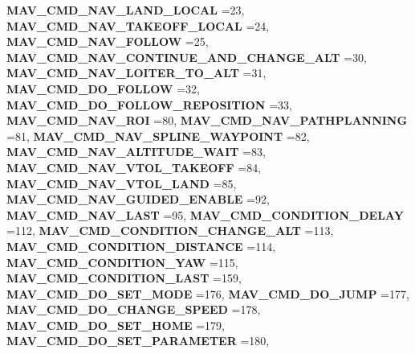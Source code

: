 \begin{DoxyCompactItemize}
\textbf{ M\+A\+V\+\_\+\+C\+M\+D\+\_\+\+N\+A\+V\+\_\+\+L\+A\+N\+D\+\_\+\+L\+O\+C\+AL} =23, 
\newline
\textbf{ M\+A\+V\+\_\+\+C\+M\+D\+\_\+\+N\+A\+V\+\_\+\+T\+A\+K\+E\+O\+F\+F\+\_\+\+L\+O\+C\+AL} =24, 
\textbf{ M\+A\+V\+\_\+\+C\+M\+D\+\_\+\+N\+A\+V\+\_\+\+F\+O\+L\+L\+OW} =25, 
\textbf{ M\+A\+V\+\_\+\+C\+M\+D\+\_\+\+N\+A\+V\+\_\+\+C\+O\+N\+T\+I\+N\+U\+E\+\_\+\+A\+N\+D\+\_\+\+C\+H\+A\+N\+G\+E\+\_\+\+A\+LT} =30, 
\textbf{ M\+A\+V\+\_\+\+C\+M\+D\+\_\+\+N\+A\+V\+\_\+\+L\+O\+I\+T\+E\+R\+\_\+\+T\+O\+\_\+\+A\+LT} =31, 
\newline
\textbf{ M\+A\+V\+\_\+\+C\+M\+D\+\_\+\+D\+O\+\_\+\+F\+O\+L\+L\+OW} =32, 
\textbf{ M\+A\+V\+\_\+\+C\+M\+D\+\_\+\+D\+O\+\_\+\+F\+O\+L\+L\+O\+W\+\_\+\+R\+E\+P\+O\+S\+I\+T\+I\+ON} =33, 
\textbf{ M\+A\+V\+\_\+\+C\+M\+D\+\_\+\+N\+A\+V\+\_\+\+R\+OI} =80, 
\textbf{ M\+A\+V\+\_\+\+C\+M\+D\+\_\+\+N\+A\+V\+\_\+\+P\+A\+T\+H\+P\+L\+A\+N\+N\+I\+NG} =81, 
\newline
\textbf{ M\+A\+V\+\_\+\+C\+M\+D\+\_\+\+N\+A\+V\+\_\+\+S\+P\+L\+I\+N\+E\+\_\+\+W\+A\+Y\+P\+O\+I\+NT} =82, 
\textbf{ M\+A\+V\+\_\+\+C\+M\+D\+\_\+\+N\+A\+V\+\_\+\+A\+L\+T\+I\+T\+U\+D\+E\+\_\+\+W\+A\+IT} =83, 
\textbf{ M\+A\+V\+\_\+\+C\+M\+D\+\_\+\+N\+A\+V\+\_\+\+V\+T\+O\+L\+\_\+\+T\+A\+K\+E\+O\+FF} =84, 
\textbf{ M\+A\+V\+\_\+\+C\+M\+D\+\_\+\+N\+A\+V\+\_\+\+V\+T\+O\+L\+\_\+\+L\+A\+ND} =85, 
\newline
\textbf{ M\+A\+V\+\_\+\+C\+M\+D\+\_\+\+N\+A\+V\+\_\+\+G\+U\+I\+D\+E\+D\+\_\+\+E\+N\+A\+B\+LE} =92, 
\textbf{ M\+A\+V\+\_\+\+C\+M\+D\+\_\+\+N\+A\+V\+\_\+\+L\+A\+ST} =95, 
\textbf{ M\+A\+V\+\_\+\+C\+M\+D\+\_\+\+C\+O\+N\+D\+I\+T\+I\+O\+N\+\_\+\+D\+E\+L\+AY} =112, 
\textbf{ M\+A\+V\+\_\+\+C\+M\+D\+\_\+\+C\+O\+N\+D\+I\+T\+I\+O\+N\+\_\+\+C\+H\+A\+N\+G\+E\+\_\+\+A\+LT} =113, 
\newline
\textbf{ M\+A\+V\+\_\+\+C\+M\+D\+\_\+\+C\+O\+N\+D\+I\+T\+I\+O\+N\+\_\+\+D\+I\+S\+T\+A\+N\+CE} =114, 
\textbf{ M\+A\+V\+\_\+\+C\+M\+D\+\_\+\+C\+O\+N\+D\+I\+T\+I\+O\+N\+\_\+\+Y\+AW} =115, 
\textbf{ M\+A\+V\+\_\+\+C\+M\+D\+\_\+\+C\+O\+N\+D\+I\+T\+I\+O\+N\+\_\+\+L\+A\+ST} =159, 
\textbf{ M\+A\+V\+\_\+\+C\+M\+D\+\_\+\+D\+O\+\_\+\+S\+E\+T\+\_\+\+M\+O\+DE} =176, 
\newline
\textbf{ M\+A\+V\+\_\+\+C\+M\+D\+\_\+\+D\+O\+\_\+\+J\+U\+MP} =177, 
\textbf{ M\+A\+V\+\_\+\+C\+M\+D\+\_\+\+D\+O\+\_\+\+C\+H\+A\+N\+G\+E\+\_\+\+S\+P\+E\+ED} =178, 
\textbf{ M\+A\+V\+\_\+\+C\+M\+D\+\_\+\+D\+O\+\_\+\+S\+E\+T\+\_\+\+H\+O\+ME} =179, 
\textbf{ M\+A\+V\+\_\+\+C\+M\+D\+\_\+\+D\+O\+\_\+\+S\+E\+T\+\_\+\+P\+A\+R\+A\+M\+E\+T\+ER} =180, 

\end{DoxyCompactItemize}
